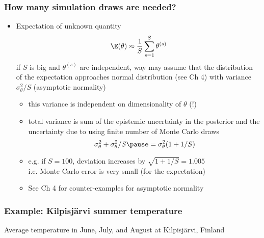 \documentclass[10pt]{beamer}
\begin{document}
\begin{frame}

\frametitle{How many simulation draws are needed?}

  \begin{itemize}
  \item Expectation of unknown quantity
    \begin{equation*}
      \E(\theta)\approx \frac{1}{S}\sum_{s=1}^S \theta^{(s)}
    \end{equation*}
    if $S$ is big and $\theta^{(s)}$ are independent, way may assume
    that the distribution of the expectation approaches normal
    distribution (see Ch 4) with variance $\sigma^2_\theta/S$
    (asymptotic normality)
    \begin{itemize}
    \item this variance is independent on dimensionality of $\theta$ (!)
      \pause
    \item total variance is sum of the epistemic uncertainty in the
      posterior and the uncertainty due to using finite number of
      Monte Carlo draws
      \begin{equation*}
        \sigma^2_\theta+\sigma^2_\theta/S \pause= \sigma^2_\theta(1+1/S)
      \end{equation*}
      \pause
      \vspace{-5mm}
    \item e.g. if $S=100$, deviation increases by $\sqrt{1+1/S}=1.005$\\
      i.e. Monte Carlo error is very small (for the expectation)
      \pause
    \item See Ch 4 for counter-examples for asymptotic normality
    \end{itemize}
\end{itemize}

\end{frame}

\begin{frame}

\frametitle{Example: Kilpisjärvi summer temperature}

  Average temperature in June, July, and August at Kilpisjärvi, Finland

  \begin{center}
  \end{center}

\end{frame}
\end{document}
